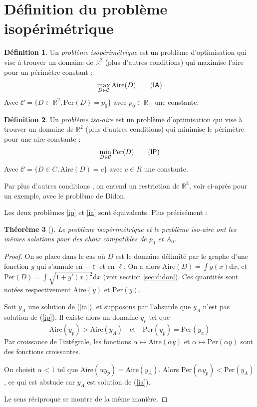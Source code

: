 \documentclass[10pt,a4paper]{article}
\newcommand{\R}{\mathbb{R}}
\newcommand{\C}{\mathcal{C}}
\renewcommand{\d}{\mathrm{d}}
\newcommand{\A}{\mathrm{Aire}}
\newcommand{\p}{\mathrm{Per}}
\newcommand{\IA}{\textsf{IA}}
\newcommand{\IP}{\textsf{IP}}
\renewcommand{\ss}{\vspace*{\baselineskip}}
\theoremstyle{plain}
\newtheorem{thm}{Théorème}[section]
\theoremstyle{definition}
\newtheorem{defi}[thm]{Définition}
\begin{document}
\section{Définition du problème isopérimétrique}

\begin{defi}
Un \emph{problème isopérimétrique} est un problème d'optimisation qui vise à trouver un domaine de $\R^2$ (plus d'autres conditions) qui maximise l'aire pour un périmètre constant :
\[\max_{D \in \C} \A(D) \label{ia}\tag{\IA}\]
Avec $\mathcal{C} = \{ D \subset\R^2, \p(D) = p_0 \}$ avec $p_0\in \R_+$ une constante.


\end{defi}

\begin{defi}
Un \emph{problème iso-aire} est un problème d'optimisation qui vise à trouver un domaine de $\R^2$ (plus d'autres conditions) qui minimise le périmètre pour une aire constante :
\[\min_{D \in \C} \p(D) \label{ip}\tag{\IP}\]
Avec $\mathcal{C} = \{ D \in C, \A(D)=c \}$ avec $c \in R$ une constante.
\end{defi}


Par \og plus d'autres conditions \fg{}, on entend un restriction de $\R^2$, voir ci-après pour un exemple, avec le problème de Didon.

\ss
Les deux problèmes \ref{ip} et \ref{ia} sont équivalents. Plus précisément :

\begin{thm}[\cite{tapia09}]
Le problème isopérimétrique et le problème iso-aire ont les mêmes solutions pour des choix compatibles de $p_0$ et $A_0$.
\end{thm}


\begin{proof}
On se place dans le cas où $D$ est le domaine délimité par le graphe d'une fonction $y$ qui s'annule en $-\ell$ et en $\ell$. On a alors $\A(D)=\int y(x)\d x$, et $\p(D)=\int\sqrt{1+y'(x)^2}\d x$ (voir section \ref{sec:didon}). Ces quantités sont notées respectivement $\A(y)$ et $\p(y)$.

Soit $y_A$ une solution de (\ref{ia}), et supposons par l'absurde que $y_A$ n'est pas solution de (\ref{ip}). Il existe alors un domaine $y_p$ tel que \[\A(y_p)>\A(y_A)\quad\text{et}\quad \p(y_p)=\p(y_a)\]
Par croissance de l'intégrale, les fonctions $\alpha\mapsto\A(\alpha y)$ et $\alpha\mapsto\p(\alpha y)$ sont des fonctions croissantes.

On choisit $\alpha<1$ tel que $\A(\alpha y_p)=\A(y_A)$. Alors $\p(\alpha y_p)<\p(y_A)$, ce qui est abstude car $y_A$ est solution de (\ref{ia}).

Le sens réciproque se montre de la même manière.
\end{proof}
\end{document}
